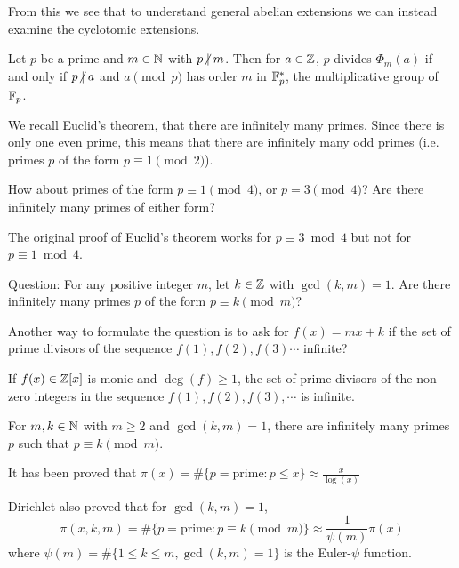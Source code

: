 \documentclass[11pt]{article}
\begin{document}
From this we see that to understand general abelian extensions we can instead examine the cyclotomic extensions.

\begin{lemma}
    Let $p$ be a prime and $m\in\mathbb{N}$ with $p\nd m$. Then for $a\in\mathbb{Z}$, $p$ divides $\Phi_m(a)$ if and only if $p\nd a$ and $a\pmod{p}$ has order $m$ in $\mathbb{F}_p^*$, the multiplicative group of $\mathbb{F}_p$.
\end{lemma}

We recall Euclid's theorem, that there are infinitely many primes. Since there is only one even prime, this means that there are infinitely many odd primes (i.e. primes $p$ of the form $p\equiv1\pmod{2}$).

How about primes of the form $p\equiv1\pmod{4}$, or $p=3\pmod{4}$? Are there infinitely many primes of either form?

\begin{remark}
    The original proof of Euclid's theorem works for $p\equiv3\bmod{4}$ but not for $p\equiv1\bmod{4}$.
\end{remark}

\begin{centeremph}[80pt]
    Question: For any positive integer $m$, let $k\in\mathbb{Z}$ with $\gcd(k,m)=1$. Are there infinitely many primes $p$ of the form $p\equiv k\pmod{m}$?
\end{centeremph}

Another way to formulate the question is to ask for $f(x)=mx+k$ if the set of prime divisors of the sequence $f(1),f(2),f(3)\cdots$ infinite?

\begin{lemma}
    If $f(x)\in\mathbb{Z}[x]$ is monic and $\deg(f)\geq1$, the set of prime divisors of the non-zero integers in the sequence $f(1),f(2),f(3),\cdots$ is infinite.
\end{lemma}

\begin{theorem}
    For $m,k\in\mathbb{N}$ with $m\geq 2$ and $\gcd(k,m)=1$, there are infinitely many primes $p$ such that $p\equiv k\pmod{m}$.
\end{theorem}

\begin{remark}
    It has been proved that $\pi(x)=\#\{p=\text{prime}:p\leq x\}\approx\frac{x}{\log(x)}$
\end{remark}
Dirichlet also proved that for $\gcd(k,m)=1$,
\[\pi(x,k,m)=\#\{p=\text{prime}:p\equiv k\pmod{m}\}\approx\frac{1}{\psi(m)}\pi(x)\]
where $\psi(m)=\#\{1\leq k\leq m,\gcd(k,m)=1\}$ is the Euler-$\psi$ function.
\end{document}
